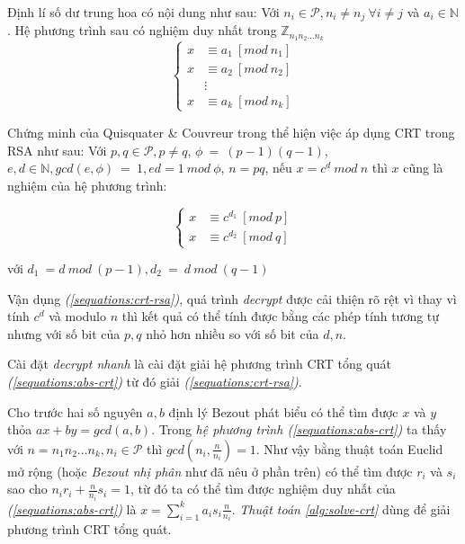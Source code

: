 Định lí số dư trung hoa có nội dung như sau: Với $n_i \in \mathcal{P}, n_i \neq n_j\ \forall i \neq j$ và $a_i \in \mathbb{N}$. Hệ phương trình sau có nghiệm 
duy nhất trong $\mathbb{Z}_{n_1n_2\hdots n_k}$
\begin{equation}\label{sequations:abs-crt}
\begin{cases}
x &\equiv a_1\ [mod\ n_1] \\
x &\equiv a_2\ [mod\ n_2] \\
& \vdots \\
x &\equiv a_k\ [mod\ n_k]
\end{cases}
\end{equation}

Chứng minh của Quisquater \& Couvreur trong \cite{Quisquater1982} thể hiện việc áp dụng CRT trong RSA như sau: Với $p, q \in \mathcal{P}, p \neq q$, $\phi\ =\ (p -1)(q-1)$, 
$e,d \in \mathbb{N}, gcd(e,\phi)\ =\ 1, ed = 1\ mod\ \phi$, $n = pq$, nếu $x = c^d\ mod \ n$ thì $x$ cũng là nghiệm của hệ phương trình:

\begin{equation}\label{sequations:crt-rsa}
\begin{cases}
x &\equiv c^{d_1}\ [mod\ p] \\
x &\equiv c^{d_2}\ [mod\ q]
\end{cases}
\end{equation}
\begin{center}
với $d_1\ = d\ mod\ (p - 1), d_2\ =\ d\ mod\ (q - 1) $
\end{center}

Vận dụng \textit{(\ref{sequations:crt-rsa})}, quá trình \textit{decrypt} được cải thiện rõ rệt vì thay vì tính $c^d$ và modulo $n$ thì kết quả có thể tính 
được bằng các phép tính tương tự nhưng với số bit của $p, q$ nhỏ hơn nhiều so với số bit của $d, n$.

Cài đặt \textit{decrypt nhanh} là cài đặt giải hệ phương trình CRT tổng quát \textit{(\ref{sequations:abs-crt})} từ đó giải \textit{(\ref{sequations:crt-rsa})}. 

Cho trước hai số nguyên $a,b$ định lý Bezout phát biểu có thể tìm được $x$ và $y$ thỏa $ax + by = gcd(a,b)$. Trong \textit{hệ phương trình 
(\ref{sequations:abs-crt})} ta thấy với $n=n_1n_2\hdots n_k, n_i \in \mathcal{P}$ thì $gcd(n_i,\frac{n}{n_i}) = 1$. Như vậy bằng thuật toán Euclid mở rộng (hoặc \textit{Bezout nhị phân} \cite{giaotrinh} như đã nêu ở phần trên) có thể tìm được 
$r_i$ và $s_i$ sao cho $n_i r_i + \frac{n}{n_i} s_i = 1$, từ đó ta có thể tìm được nghiệm duy nhất của \textit{(\ref{sequations:abs-crt})} là $x = \sum_{i=1}^{k}a_is_i\frac{n}{n_i}$. 
\textit{Thuật toán \ref{alg:solve-crt}} dùng để giải phương trình CRT tổng quát.

